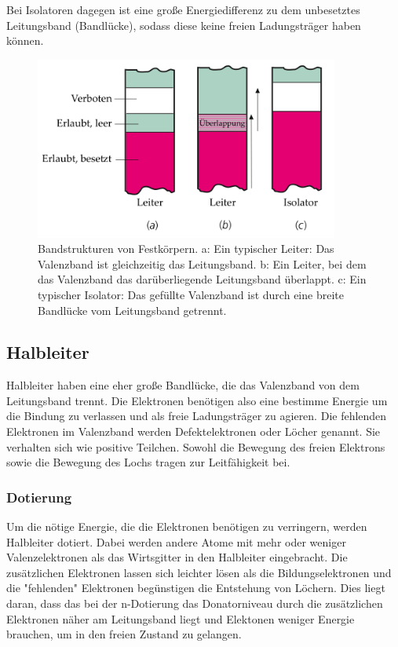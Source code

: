 \documentclass[a4paper]{scrartcl}
\numberwithin{equation}{subsection}
\begin{document}
Bei Isolatoren dagegen ist eine große Energiedifferenz zu dem unbesetztes Leitungsband (Bandlücke), sodass diese keine freien Ladungsträger haben können.

\begin{figure}[H]
\includegraphics[width=10cm]{Bandstrukturen}
\centering
\caption{Bandstrukturen von Festkörpern. a: Ein typischer Leiter: Das Valenzband ist gleichzeitig das Leitungsband. b: Ein Leiter, bei dem das Valenzband das darüberliegende Leitungsband überlappt. c: Ein typischer Isolator: Das gefüllte Valenzband ist durch eine breite Bandlücke vom Leitungsband getrennt. \cite{tipler}}
\centering
\label{fig:bandstrukturen_leiter-isolator}
\end{figure}

\subsection{Halbleiter}
Halbleiter haben eine eher große Bandlücke, die das Valenzband von dem Leitungsband trennt.
Die Elektronen benötigen also eine bestimme Energie um die Bindung zu verlassen und als freie Ladungsträger zu agieren. \cite{werk}
Die fehlenden Elektronen im Valenzband werden Defektelektronen oder Löcher genannt. Sie verhalten sich wie positive Teilchen. \cite{hering}
Sowohl die Bewegung des freien Elektrons sowie die Bewegung des Lochs tragen zur Leitfähigkeit bei.

\subsubsection{Dotierung}
Um die nötige Energie, die die Elektronen benötigen zu verringern, werden Halbleiter dotiert. Dabei werden andere Atome mit mehr oder weniger Valenzelektronen als das Wirtsgitter in den Halbleiter eingebracht. 
Die zusätzlichen Elektronen lassen sich leichter lösen als die Bildungselektronen und die "fehlenden" Elektronen begünstigen die Entstehung von Löchern. Dies liegt daran, dass das bei der n-Dotierung das Donatorniveau durch die zusätzlichen Elektronen näher am Leitungsband liegt und Elektonen weniger Energie brauchen, um in den freien Zustand zu gelangen. \cite{werk}
\end{document}
